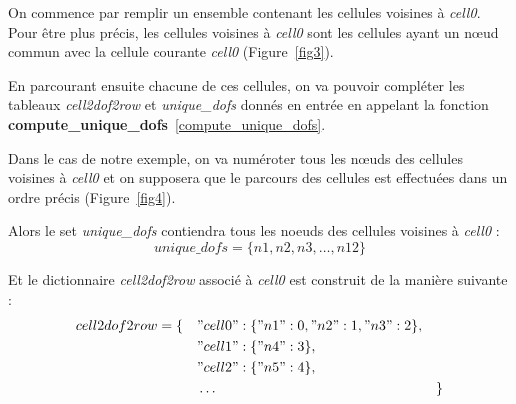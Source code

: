 \documentclass[french]{article}
\begin{document}
	On commence par remplir un ensemble contenant les cellules voisines à \textit{cell0}. Pour être plus précis, les cellules voisines à \textit{cell0} sont les cellules ayant un nœud commun avec la cellule courante \textit{cell0} (Figure~\ref{fig3}).
	
	En parcourant ensuite chacune de ces cellules, on va pouvoir compléter les tableaux \textit{cell2dof2row} et \textit{unique\_dofs} donnés en entrée en appelant la fonction \textbf{compute\_unique\_dofs}~\ref{compute_unique_dofs}. 
	
	Dans le cas de notre exemple, on va numéroter tous les nœuds des cellules voisines à \textit{cell0} et on supposera que le parcours des cellules est effectuées dans un ordre précis (Figure~\ref{fig4}).
	
	Alors le set \textit{unique\_dofs} contiendra tous les noeuds des cellules voisines à \textit{cell0} : 
	$$unique\_dofs = \{n1,n2,n3,\dots,n12\}$$
	
	Et le dictionnaire \textit{cell2dof2row} associé à \textit{cell0} est construit de la manière suivante :
	$$cell2dof2row = \begin{aligned}[t]
		\{\quad&"cell0":\{"n1":0,"n2":1,"n3":2\},&& \\
		&"cell1":\{"n4":3\}, \\
		&"cell2":\{"n5":4\}, \\
		&\dots &&\}
	\end{aligned}$$
\end{document}
